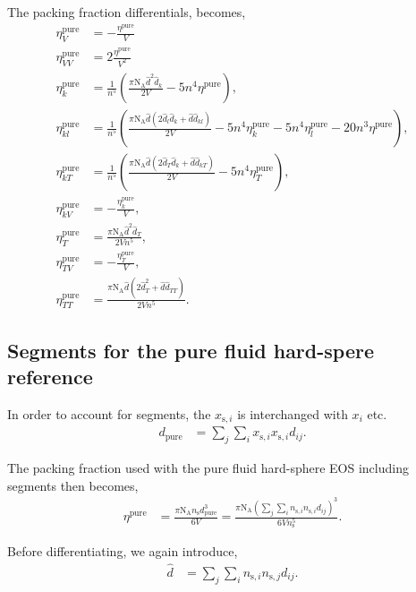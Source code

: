 \documentclass[english]{../thermomemo/thermomemo}
\newcommand*{\lb}{\left(}
\newcommand*{\rb}{\right)}
\newcommand{\hs}{\text{HS}\xspace}
\newcommand{\seg}{\ensuremath{\text{s}}\xspace}
\newcommand{\pure}{\ensuremath{\text{pure}}\xspace}
\newcommand{\NA}{\ensuremath{\text{N}_{\text{A}}}\xspace}
\begin{document}
The packing fraction differentials, becomes,
\begin{align}
  \label{eq:eta_BH_pure_diff}
  \eta^{\pure}_V &= -\frac{\eta^{\pure}}{V} \\
  \eta^{\pure}_{VV} &= 2\frac{\eta^{\pure}}{V^2} \\
  \eta^{\pure}_k &= \frac{ 1}{n^5}\lb \frac{ \pi \NA \hat{d}^2 \hat{d}_k }{2 V} - 5 n^4 \eta^{\pure} \rb,\\
  \eta^{\pure}_{kl} &= \frac{ 1}{n^5}\lb \frac{ \pi \NA \hat{d} \lb 2\hat{d}_l\hat{d}_k + \hat{d}\hat{d}_{kl}\rb}{2 V} - 5 n^4 \eta^{\pure}_k - 5 n^4 \eta^{\pure}_l - 20 n^3 \eta^{\pure} \rb,\\
  \eta^{\pure}_{kT} &= \frac{ 1}{n^5}\lb \frac{ \pi \NA \hat{d}\lb 2 \hat{d}_T \hat{d}_k + \hat{d}\hat{d}_{kT} \rb}{2 V} - 5 n^4 \eta^{\pure}_T \rb,\\
  \eta^{\pure}_{kV} &= -\frac{\eta^{\pure}_k}{V},\\
  \eta^{\pure}_T &= \frac{ \pi \NA \hat{d}^2 \hat{d}_{T} }{2 V n^5}, \\
  \eta^{\pure}_{TV} &= -\frac{\eta^{\pure}_T}{V}, \\
  \eta^{\pure}_{TT} &= \frac{ \pi \NA \hat{d} \lb 2  \hat{d}_{T}^2 + \hat{d}\hat{d}_{TT}\rb}{2 V n^5}.
\end{align}

\subsection{Segments for the pure fluid hard-spere reference}
In order to account for segments, the $x_{\seg,i}$ is interchanged
with $x_{i}$ etc.
\begin{align}
  \label{eq:d_BH_pure_ms}
  d_{\pure} &= \sum_j \sum_i x_{\seg,i} x_{\seg,i} d_{ij}.
\end{align}

The packing fraction used with the pure fluid hard-sphere EOS including segments then becomes,
\begin{align}
  \label{eq:eta_BH_pure_ms}
  \eta^{\pure} &= \frac{ \pi \NA n_\seg d_{\pure}^3}{6 V} = \frac{ \pi \NA \lb \sum_j \sum_i n_{\seg,i} n_{\seg,i} d_{ij} \rb^3}{6 V n_\seg^5}.
\end{align}

Before differentiating, we again introduce,
\begin{align}
  \label{eq:d_BH_hat_ms}
  \hat{d} &=  \sum_j \sum_i n_{\seg,i} n_{\seg,j} d_{ij}.
\end{align}
\end{document}
